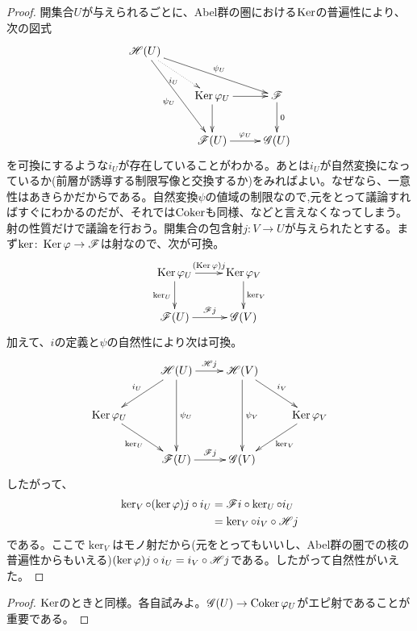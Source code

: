 \begin{proof}

開集合$U$が与えられるごとに、Abel群の圏における$\operatorname{Ker}$の普遍性により、次の図式
\[
\xymatrix{
\scrh(U) \ar@{.>}[dr]_-{i_U} \ar[drr]^-{\psi_U} \ar[ddr]_-{\psi_U}  & {} & { } \\
{} & \Ker \vp_U \ar[r] \ar[d] & \scrf \ar[d]^-{0} \\
{} & \scrf(U) \ar[r]^-{\vp_U} & \scrg(U)
}
\]
を可換にするような$i_U$が存在していることがわかる。あとは$i_U$が自然変換になっているか(前層が誘導する制限写像と交換するか)をみればよい。なぜなら、一意性はあきらかだからである。自然変換$\psi$の値域の制限なので,元をとって議論すればすぐにわかるのだが、それでは$\operatorname{Coker}$も同様、などと言えなくなってしまう。射の性質だけで議論を行おう。開集合の包含射$j \colon V \to U$が与えられたとする。まず$\ker \colon \operatorname{Ker} {\varphi} \to \mathscr{F}$は射なので、次が可換。
\[
\xymatrix{
\Ker \vp_U \ar[r]^-{(\Ker \vp)j } \ar[d]_{\ker_U} & \Ker \vp_V \ar[d]^-{\ker_V} \\
\scrf(U) \ar[r]^-{\scrf j} & \scrg(V)
}
\]
加えて、$i$の定義と$\psi$の自然性により次は可換。
\[
\xymatrix{
{} & \scrh(U) \ar[dl]_-{i_U} \ar[r]^-{\scrh j} \ar[dd]^-{\psi_U} & \scrh(V) \ar[dr]^-{i_V} \ar[dd]^-{\psi_V} & {} \\
\Ker \vp_U \ar[dr]_-{\ker_U} & {} & {} & \Ker \vp_V \ar[dl]^-{\ker_V} \\
{} & \scrf(U) \ar[r]^-{\scrf j} & \scrg(V) & {}
}
\]
したがって、
\begin{align*}
  \ker_V \circ (\ker {\varphi})j \circ i_U &= \mathscr{F} i \circ \ker_U \circ i_U \\
  &= \ker_V \circ i_V \circ \mathscr{H} j
\end{align*}
である。ここで$\ker_V$はモノ射だから(元をとってもいいし、Abel群の圏での核の普遍性からもいえる)$(\ker {\varphi})j \circ i_U =i_V \circ \mathscr{H} j $である。したがって自然性がいえた。
\end{proof}


\begin{proof}
  $\operatorname{Ker}$のときと同様。各自試みよ。$\mathscr{G}(U) \to \operatorname{Coker} {\varphi}_U$がエピ射であることが重要である。
\end{proof}


